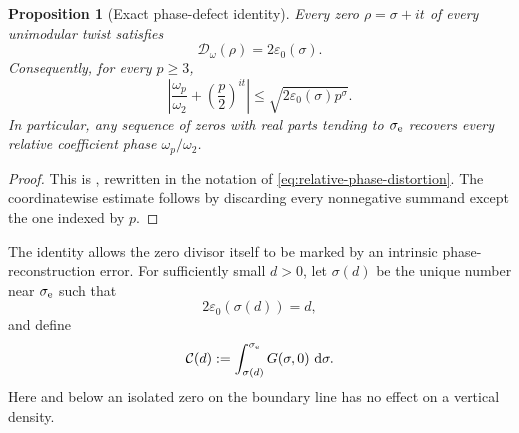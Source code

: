 \documentclass[11pt]{article}
\newtheorem{proposition}[theorem]{Proposition}
\theoremstyle{definition}
\theoremstyle{remark}
\newcommand{\dd}{\,\mathrm d}
\newcommand{\eps}{\varepsilon}
\begin{document}
\begin{proposition}[Exact phase-defect identity]
\label{prop:distortion-defect}
Every zero $\rho=\sigma+it$ of every unimodular twist satisfies
\begin{equation}
\label{eq:distortion-defect}
 \boxed{\mathcal D_\omega(\rho)=2\eps_0(\sigma).}
\end{equation}
Consequently, for every $p\geq3$,
\begin{equation}
\label{eq:coordinate-phase-bound}
 \left|\frac{\omega_p}{\omega_2}
       +\left(\frac p2\right)^{it}\right|
 \leq \sqrt{2\eps_0(\sigma)p^\sigma}.
\end{equation}
In particular, any sequence of zeros with real parts tending to
$\sigma_{\rm e}$ recovers every relative coefficient phase
$\omega_p/\omega_2$.
\end{proposition}

\begin{proof}
This is , rewritten in the notation of
\eqref{eq:relative-phase-distortion}.  The coordinatewise estimate follows
by discarding every nonnegative summand except the one indexed by $p$.
\end{proof}

The identity allows the zero divisor itself to be marked by an intrinsic
phase-reconstruction error.  For sufficiently small $d>0$, let $\sigma(d)$
be the unique number near $\sigma_{\rm e}$ such that
\begin{equation}
\label{eq:sigma-of-distortion}
 2\eps_0(\sigma(d))=d,
\end{equation}
and define
\begin{equation}
\label{eq:distortion-intensity}
 \mathcal C(d):=\int_{\sigma(d)}^{\sigma_{\rm e}}G(\sigma,0)\,\dd\sigma.
\end{equation}
Here and below an isolated zero on the boundary line has no effect on a
vertical density.
\end{document}
